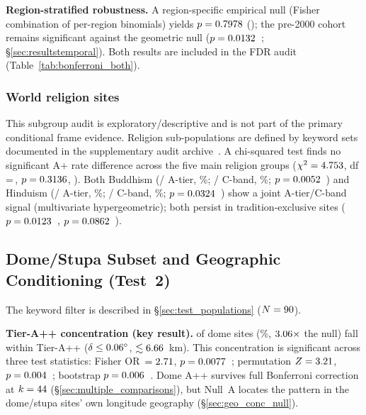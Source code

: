 \textbf{Region-stratified robustness.}
A region-specific empirical null (Fisher combination of per-region binomials)
yields $p = 0.7978$ (\pRegionEmpAllSig{}); the pre-2000 cohort remains significant
against the geometric null ($p = 0.0132$~\pPreTwoKSig{}; \S\ref{sec:resultstemporal}).
Both results are included in the FDR audit (Table~\ref{tab:bonferroni_both}).

\subsubsection*{World religion sites}
\label{sec:resultsrelig}
This subgroup audit is exploratory/descriptive and is not part of the
primary conditional frame evidence.
Religion sub-populations are defined by keyword sets documented in the supplementary audit archive~\citep{tenenbaum2026audit}.
A chi-squared test finds no significant A+ rate difference across the five main
religion groups ($\chi^2 = 4.753$, df\,=\,\religChiSqDof,
$p = 0.3136$, \pReligChiSqSig{}).
Both Buddhism (\NbudATier/\NbudSitesRelig{} A-tier, \budATierRate\%;
\NbudInterHarmonic/\NbudSitesRelig{} C-band, \budInterHarmonicRate\%;
$p = 0.0052$~\pBudJointSig{}) and Hinduism (\NhinATier/\NhinSites{} A-tier, \hinATierRate\%;
\NhinInterHarmonic/\NhinSites{} C-band, \hinInterHarmonicRate\%;
$p = 0.0324$~\pHinJointSig{}) show a joint A-tier/C-band signal
(multivariate hypergeometric); both persist in tradition-exclusive sites
($p = 0.0123$~\pBudExclJointSig{}, $p = 0.0862$~\pHinExclJointSig{}).

\subsection{Dome/Stupa Subset and Geographic Conditioning (Test~2)}
\label{sec:resultscircular}

The keyword filter is described in \S\ref{sec:test_populations} ($N = 90$).

\textbf{Tier-A++ concentration (key result).}
\NcircTierApp{} of \NcircTotal{} dome sites (\NcircAppRate\%, $3.06\times$ the \NullRateApp{} null)
fall within Tier-A++ ($\delta \leq \AppThreshDeg{}\textdegree{}$, $\lesssim6.66{}$~km).
This concentration is significant across three test statistics:
Fisher OR~$= 2.71$, $p = 0.0077$~\pCircAppFisherSig{};
permutation $Z = 3.21$, $p = 0.004$~\pCircAppPermSig{};
bootstrap $p = 0.006$~\pCircAppBootSig{}.
Dome A++ survives full Bonferroni correction at $k = 44$
(\S\ref{sec:multiple_comparisons}), but Null~A locates the pattern in
the dome/stupa sites' own longitude geography
(\S\ref{sec:geo_conc_null}).

